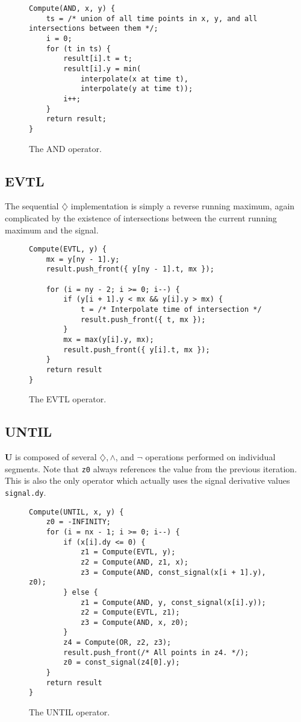 \documentclass[a4paper,10pt]{article}
\renewcommand{\And}{\wedge}
\newcommand{\Neg}{\neg}
\newcommand{\Until}{\mathbf{U}}
\newcommand{\Evtl}{\diamondsuit}
\begin{document}
\begin{figure}[ht]
\begin{lstlisting}
Compute(AND, x, y) {
    ts = /* union of all time points in x, y, and all intersections between them */;
    i = 0;
    for (t in ts) {
        result[i].t = t;
        result[i].y = min(
            interpolate(x at time t),
            interpolate(y at time t));
        i++;
    }
    return result;
}
\end{lstlisting}
\label{fig:and}
\caption{The AND operator.}
\end{figure}

\subsection{EVTL}

The sequential $\Evtl$ implementation is simply a reverse running maximum, again
complicated by the existence of intersections between the current running maximum
and the signal.

\begin{figure}[ht]
\begin{lstlisting}
Compute(EVTL, y) {
    mx = y[ny - 1].y;
    result.push_front({ y[ny - 1].t, mx });

    for (i = ny - 2; i >= 0; i--) {
        if (y[i + 1].y < mx && y[i].y > mx) {
            t = /* Interpolate time of intersection */
            result.push_front({ t, mx });
        }
        mx = max(y[i].y, mx);
        result.push_front({ y[i].t, mx });
    }
    return result
}
\end{lstlisting}
\label{fig:evtl}
\caption{The EVTL operator.}
\end{figure}

\subsection{UNTIL}

$\Until$ is composed of several $\Evtl, \And$, and $\Neg$ operations performed on
individual segments. Note that \lstinline|z0| always references the value from the
previous iteration. This is also the only operator which actually uses the signal derivative
values \lstinline|signal.dy|.

\begin{figure}[ht]
\begin{lstlisting}
Compute(UNTIL, x, y) {
    z0 = -INFINITY;
    for (i = nx - 1; i >= 0; i--) {
        if (x[i].dy <= 0) {
            z1 = Compute(EVTL, y);
            z2 = Compute(AND, z1, x);
            z3 = Compute(AND, const_signal(x[i + 1].y), z0);
        } else {
            z1 = Compute(AND, y, const_signal(x[i].y));
            z2 = Compute(EVTL, z1);
            z3 = Compute(AND, x, z0);
        }
        z4 = Compute(OR, z2, z3);
        result.push_front(/* All points in z4. */);
        z0 = const_signal(z4[0].y);
    }
    return result
}
\end{lstlisting}
\label{fig:until}
\caption{The UNTIL operator.}
\end{figure}
\end{document}
